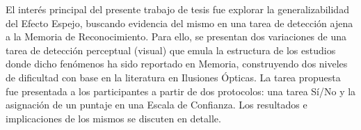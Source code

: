 El interés principal del presente trabajo de tesis fue explorar la generalizabilidad del Efecto Espejo, buscando evidencia del mismo en una tarea de detección ajena a la Memoria de Reconocimiento. Para ello, se presentan dos variaciones de una tarea de detección perceptual (visual) que emula la estructura de los estudios donde dicho fenómenos ha sido reportado en Memoria, construyendo dos niveles de dificultad con base en la literatura en Ilusiones Ópticas. La tarea propuesta fue presentada a los participantes a partir de dos protocolos: una tarea Sí/No y la asignación de un puntaje en una Escala de Confianza. Los resultados e implicaciones de los mismos se discuten en detalle.\\